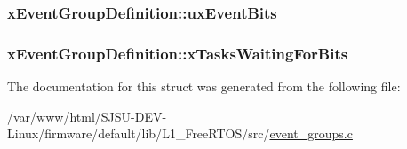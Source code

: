 \subsubsection[{\texorpdfstring{ux\+Event\+Bits}{uxEventBits}}]{ x\+Event\+Group\+Definition\+::ux\+Event\+Bits}\hypertarget{structxEventGroupDefinition_ad7c19a46f5f4557e466209962b5e4610}{}\label{structxEventGroupDefinition_ad7c19a46f5f4557e466209962b5e4610}
\subsubsection[{\texorpdfstring{x\+Tasks\+Waiting\+For\+Bits}{xTasksWaitingForBits}}]{ x\+Event\+Group\+Definition\+::x\+Tasks\+Waiting\+For\+Bits}\hypertarget{structxEventGroupDefinition_a6570ba98d93dcba9cb03de0c62df9044}{}\label{structxEventGroupDefinition_a6570ba98d93dcba9cb03de0c62df9044}


The documentation for this struct was generated from the following file\+:\begin{DoxyCompactItemize}
\item 
/var/www/html/\+S\+J\+S\+U-\/\+D\+E\+V-\/\+Linux/firmware/default/lib/\+L1\+\_\+\+Free\+R\+T\+O\+S/src/\hyperlink{event__groups_8c}{event\+\_\+groups.\+c}\end{DoxyCompactItemize}
